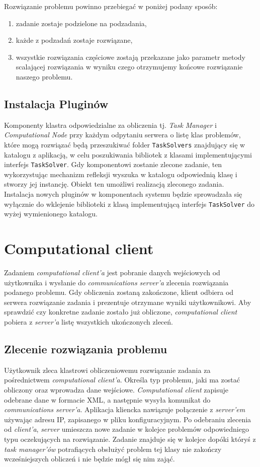 \documentclass[12pt,a4paper,titlepage]{report}
\begin{document}
	Rozwiązanie problemu powinno przebiegać w poniżej podany sposób:
		\begin{enumerate}[(1)]
			\item zadanie zostaje podzielone na podzadania,
			\item każde z podzadań zostaje rozwiązane,
			\item wszystkie rozwiązania częściowe zostają przekazane jako parametr metody scalającej rozwiązania
			w wyniku czego otrzymujemy końcowe rozwiązanie naszego problemu.
		\end{enumerate}
	 \section{Instalacja Pluginów}
	Komponenty klastra odpowiedzialne za obliczenia tj. \textit{Task Manager} i \textit{Computational Node} przy każdym odpytaniu serwera o listę klas problemów, które mogą rozwiązać będą przeszukiwać folder \verb+TaskSolvers+ znajdujący się w katalogu z aplikacją, w celu poszukiwania bibliotek z klasami implementującymi interfejs \verb+TaskSolver+. Gdy komponentowi zostanie zlecone zadanie, ten wykorzystując mechanizm refleksji wyszuka w katalogu odpowiednią klasę i stworzy jej instancję. Obiekt ten  umożliwi realizacją zleconego zadania.\\
	 Instalacja nowych pluginów w komponentach systemu będzie sprowadzała się wyłącznie do wklejenie biblioteki z klasą implementującą interfejs \verb+TaskSolver+ do wyżej wymienionego katalogu.	
	
	
	\chapter{Computational client}
	Zadaniem \emph{computational client'a} jest pobranie danych wejściowych od użytkownika i wysłanie do \emph{communications server'a} zlecenia rozwiązania podanego problemu. Gdy obliczenia zostaną zakończone, klient odbiera od serwera rozwiązanie zadania i prezentuje otrzymane wyniki użytkownikowi. Aby sprawdzić czy konkretne zadanie zostało już obliczone, \emph{computational client} pobiera z \emph{server'a} listę wszystkich ukończonych zleceń.\\
	
	\section{Zlecenie rozwiązania problemu}
	Użytkownik zleca klastrowi obliczeniowemu rozwiązanie zadania za pośrednictwem \emph{computational client'a}. Określa typ problemu, jaki ma zostać obliczony oraz wprowadza dane wejściowe. \emph{Computational client} zapisuje odebrane dane w formacie XML, a następnie wysyła komunikat do \emph{communications server'a}. Aplikacja kliencka nawiązuje połączenie z \emph{server'em} używając adresu IP, zapisanego w pliku konfiguracyjnym. Po odebraniu zlecenia od \emph{client'a}, \emph{server} umieszcza nowe zadanie w kolejce problemów odpowiedniego typu oczekujących na rozwiązanie. Zadanie znajduje się w kolejce dopóki któryś z \emph{task manager'ów} potrafiących obsłużyć problem tej klasy nie zakończy wcześniejszych obliczeń i nie będzie mógł się nim zająć.\\
	
\end{document}
